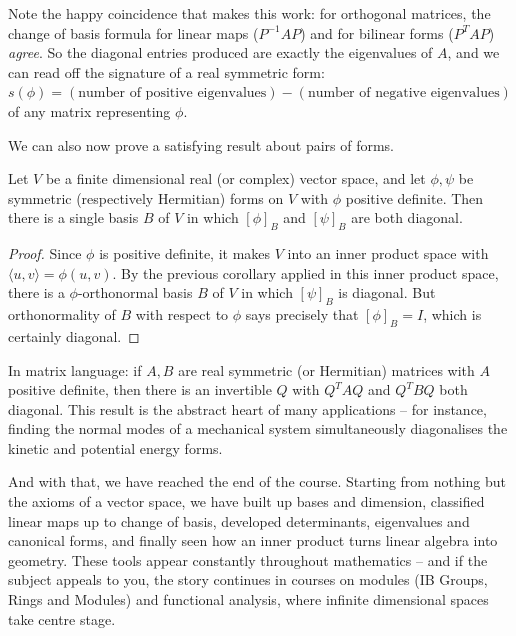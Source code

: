 Note the happy coincidence that makes this work: for orthogonal matrices, the change of basis formula for linear maps ($P^{-1}AP$) and for bilinear forms ($P^TAP$) \emph{agree}. So the diagonal entries produced are exactly the eigenvalues of $A$, and we can read off the signature of a real symmetric form: $s(\phi) = (\text{number of positive eigenvalues}) - (\text{number of negative eigenvalues})$ of any matrix representing $\phi$.

We can also now prove a satisfying result about pairs of forms.

\begin{corollary}
    Let $V$ be a finite dimensional real (or complex) vector space, and let $\phi, \psi$ be symmetric (respectively Hermitian) forms on $V$ with $\phi$ positive definite. Then there is a single basis $B$ of $V$ in which $[\phi]_B$ and $[\psi]_B$ are both diagonal.
\end{corollary}
\begin{proof}
    Since $\phi$ is positive definite, it makes $V$ into an inner product space with $\langle u, v\rangle = \phi(u, v)$. By the previous corollary applied in this inner product space, there is a $\phi$-orthonormal basis $B$ of $V$ in which $[\psi]_B$ is diagonal. But orthonormality of $B$ with respect to $\phi$ says precisely that $[\phi]_B = I$, which is certainly diagonal.
\end{proof}

In matrix language: if $A, B$ are real symmetric (or Hermitian) matrices with $A$ positive definite, then there is an invertible $Q$ with $Q^TAQ$ and $Q^TBQ$ both diagonal. This result is the abstract heart of many applications -- for instance, finding the normal modes of a mechanical system simultaneously diagonalises the kinetic and potential energy forms.

And with that, we have reached the end of the course. Starting from nothing but the axioms of a vector space, we have built up bases and dimension, classified linear maps up to change of basis, developed determinants, eigenvalues and canonical forms, and finally seen how an inner product turns linear algebra into geometry. These tools appear constantly throughout mathematics -- and if the subject appeals to you, the story continues in courses on modules (IB Groups, Rings and Modules) and functional analysis, where infinite dimensional spaces take centre stage.

